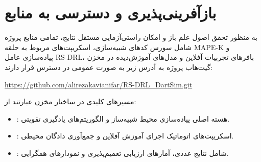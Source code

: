 \documentclass[oneside,openany,a4paper,12pt]{article}
\begin{document}
\section{بازآفرینی‌پذیری و دسترسی به منابع}
به منظور تحقق اصول علم باز و امکان راستی‌آزمایی مستقل نتایج، تمامی منابع پروژه شامل سورس کدهای شبیه‌سازی، اسکریپت‌های مربوط به حلقه MAPE-K و پیاده‌سازی عامل RS-DRL، بافرهای تجربیات آفلاین و مدل‌های آموزش‌دیده در مخزن گیت‌هاب پروژه به آدرس زیر به صورت عمومی در دسترس قرار دارند:
\begin{center}
\url{https://github.com/alirezakavianifar/RS-DRL_DartSim.git}
\end{center}
مسیرهای کلیدی در ساختار مخزن عبارتند از:
\begin{itemize}
    \item {}: هسته اصلی پیاده‌سازی محیط شبیه‌ساز و الگوریتم‌های یادگیری تقویتی.
    \item {}: اسکریپت‌های اتوماتیک اجرای آموزش آفلاین و جمع‌آوری دادگان محیطی.
    \item {}: شامل نتایج عددی، آمارهای ارزیابی تعمیم‌پذیری و نمودارهای همگرایی.
\end{itemize}
\end{document}
